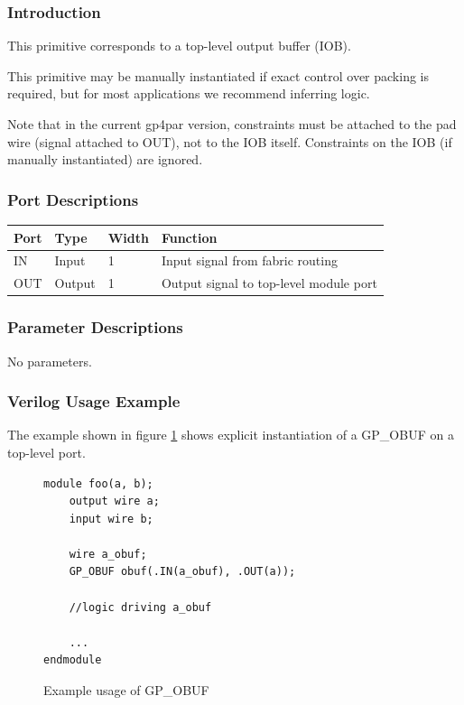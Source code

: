 \documentclass{article}
\begin{document}
\subsubsection{Introduction}
This primitive corresponds to a top-level output buffer (IOB).

This primitive may be manually instantiated if exact control over packing is required, but for most applications we 
recommend inferring logic.

Note that in the current gp4par version, constraints must be attached to the pad wire (signal attached to OUT), not 
to the IOB itself. Constraints on the IOB (if manually instantiated) are ignored.

\subsubsection{Port Descriptions}

\begin{tabularx}{4in}{|l|l|l|X|}
\hline
{\bfseries Port} & {\bfseries Type} & {\bfseries Width} & {\bfseries Function} \\
\hline
IN & Input & 1 & Input signal from fabric routing \\
\hline
OUT & Output & 1 & Output signal to top-level module port \\
\hline
\end{tabularx}

\subsubsection{Parameter Descriptions}

No parameters.

\subsubsection{Verilog Usage Example}

The example shown in figure \ref{gp-obuf-example} shows explicit instantiation of a GP\_OBUF on a top-level port.

\begin{figure}[h]
\begin{lstlisting}
module foo(a, b);
	output wire a;
	input wire b;
	
	wire a_obuf;
	GP_OBUF obuf(.IN(a_obuf), .OUT(a));
	
	//logic driving a_obuf
	
	...
endmodule
\end{lstlisting}
\caption{Example usage of GP\_OBUF}
\label{gp-obuf-example}
\end{figure}
\end{document}

